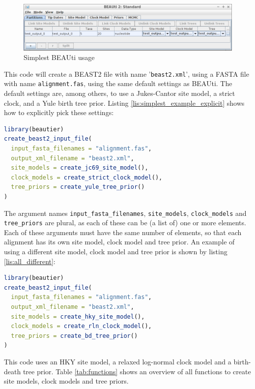 \documentclass{article}
\begin{document}
\begin{figure}
  \centering
  \includegraphics[]{all_default.png}
  \caption{Simplest BEAUti usage}
  \label{fig:simplest_beauti_usage}
\end{figure}

This code will create a BEAST2 file with name '\verb;beast2.xml;',
using a FASTA file with name \verb;alignment.fas;, using the same default settings as BEAUti.
The default settings are, among others, to use a Jukes-Cantor site model, a strict clock,
and a Yule birth tree prior. Listing \ref{lis:simplest_example_explicit} shows how
to explicitly pick these settings:

\begin{lstlisting}[language=R, caption=Simplest example with explicit defaults, label=lst:simplest_example_explicit, floatplacement=H]
library(beautier)
create_beast2_input_file(
  input_fasta_filenames = "alignment.fas",
  output_xml_filename = "beast2.xml",
  site_models = create_jc69_site_model(),
  clock_models = create_strict_clock_model(),
  tree_priors = create_yule_tree_prior()
)
\end{lstlisting}

The argument names \verb;input_fasta_filenames;, \verb;site_models;, \verb;clock_models; and \verb;tree_priors; are plural, as each of these
can be (a list of) one or more elements. Each of these arguments must have the same number of elements, so that each alignment has its
own site model, clock model and tree prior. An example of using a different site model, clock model and tree prior is shown by listing \ref{lis:all_different}:

\begin{lstlisting}[language=R, caption=Example with different site model and clock model and tree prior, label=lst:all_different, floatplacement=H]
library(beautier)
create_beast2_input_file(
  input_fasta_filenames = "alignment.fas",
  output_xml_filename = "beast2.xml",
  site_models = create_hky_site_model(),
  clock_models = create_rln_clock_model(),
  tree_priors = create_bd_tree_prior()
)
\end{lstlisting}

This code uses an HKY site model, a relaxed log-normal clock model and a birth-death tree prior.
Table \ref{tab:functions} shows an overview of all functions to create site models, clock models and tree priors.
\end{document}

